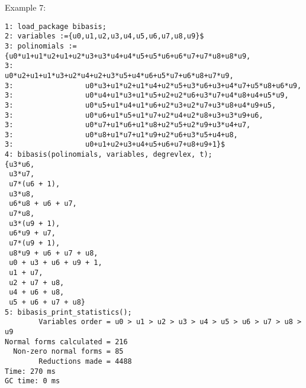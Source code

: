 \noindent Example 7:
\begin{verbatim}
1: load_package bibasis;
2: variables :={u0,u1,u2,u3,u4,u5,u6,u7,u8,u9}$
3: polinomials := {u0*u1+u1*u2+u1+u2*u3+u3*u4+u4*u5+u5*u6+u6*u7+u7*u8+u8*u9,
3:                 u0*u2+u1+u1*u3+u2*u4+u2+u3*u5+u4*u6+u5*u7+u6*u8+u7*u9,
3:                 u0*u3+u1*u2+u1*u4+u2*u5+u3*u6+u3+u4*u7+u5*u8+u6*u9,
3:                 u0*u4+u1*u3+u1*u5+u2+u2*u6+u3*u7+u4*u8+u4+u5*u9,
3:                 u0*u5+u1*u4+u1*u6+u2*u3+u2*u7+u3*u8+u4*u9+u5,
3:                 u0*u6+u1*u5+u1*u7+u2*u4+u2*u8+u3+u3*u9+u6,
3:                 u0*u7+u1*u6+u1*u8+u2*u5+u2*u9+u3*u4+u7,
3:                 u0*u8+u1*u7+u1*u9+u2*u6+u3*u5+u4+u8,
3:                 u0+u1+u2+u3+u4+u5+u6+u7+u8+u9+1}$
4: bibasis(polinomials, variables, degrevlex, t);
{u3*u6,
 u3*u7,
 u7*(u6 + 1),
 u3*u8,
 u6*u8 + u6 + u7,
 u7*u8,
 u3*(u9 + 1),
 u6*u9 + u7,
 u7*(u9 + 1),
 u8*u9 + u6 + u7 + u8,
 u0 + u3 + u6 + u9 + 1,
 u1 + u7,
 u2 + u7 + u8,
 u4 + u6 + u8,
 u5 + u6 + u7 + u8}
5: bibasis_print_statistics();
        Variables order = u0 > u1 > u2 > u3 > u4 > u5 > u6 > u7 > u8 > u9
Normal forms calculated = 216
  Non-zero normal forms = 85
        Reductions made = 4488
Time: 270 ms
GC time: 0 ms

\end{verbatim}

